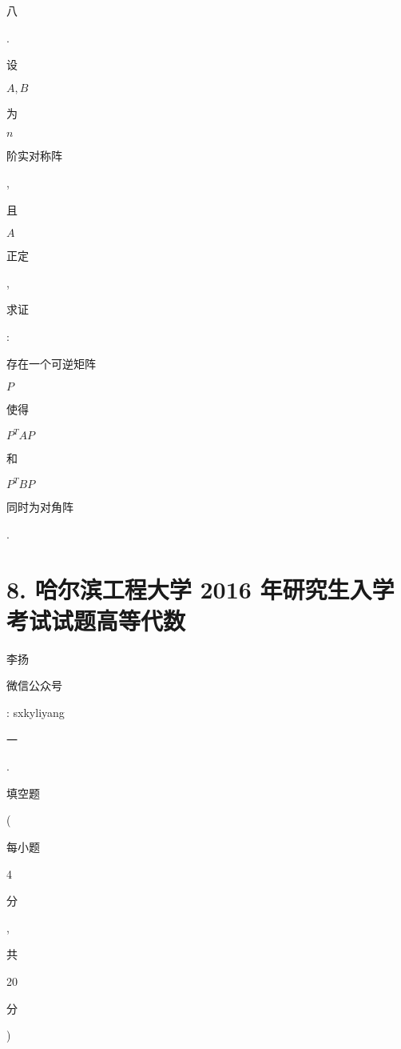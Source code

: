 \documentclass[10pt]{article}
\begin{document}
\begin{CJK}{UTF8}{mj}八\end{CJK}. \begin{CJK}{UTF8}{mj}设\end{CJK} $A, B$ \begin{CJK}{UTF8}{mj}为\end{CJK} $n$ \begin{CJK}{UTF8}{mj}阶实对称阵\end{CJK}, \begin{CJK}{UTF8}{mj}且\end{CJK} $A$ \begin{CJK}{UTF8}{mj}正定\end{CJK}, \begin{CJK}{UTF8}{mj}求证\end{CJK}: \begin{CJK}{UTF8}{mj}存在一个可逆矩阵\end{CJK} $P$ \begin{CJK}{UTF8}{mj}使得\end{CJK} $P^{T} A P$ \begin{CJK}{UTF8}{mj}和\end{CJK} $P^{T} B P$ \begin{CJK}{UTF8}{mj}同时为对角阵\end{CJK}.

\section{8. 哈尔滨工程大学 2016 年研究生入学考试试题高等代数}
\begin{CJK}{UTF8}{mj}李扬\end{CJK}

\begin{CJK}{UTF8}{mj}微信公众号\end{CJK}: sxkyliyang

\begin{CJK}{UTF8}{mj}一\end{CJK}. \begin{CJK}{UTF8}{mj}填空题\end{CJK} (\begin{CJK}{UTF8}{mj}每小题\end{CJK} 4 \begin{CJK}{UTF8}{mj}分\end{CJK}, \begin{CJK}{UTF8}{mj}共\end{CJK} 20 \begin{CJK}{UTF8}{mj}分\end{CJK})
\end{document}
